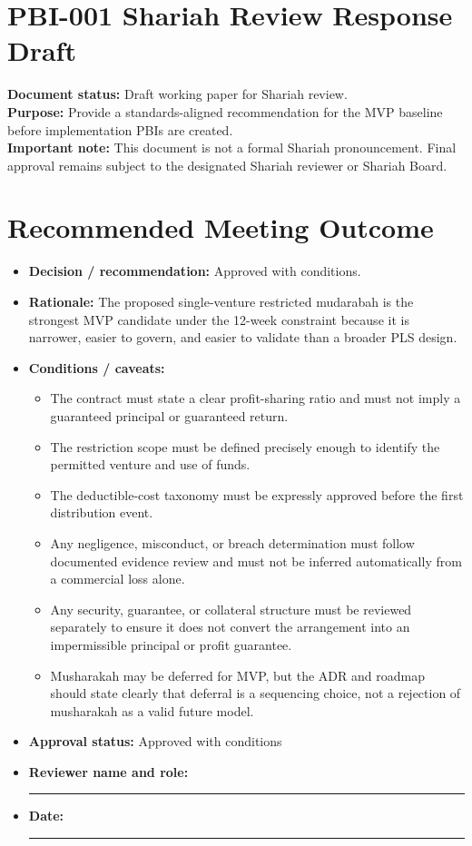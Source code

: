 \documentclass[11pt]{article}
\begin{document}
\section*{PBI-001 Shariah Review Response Draft}

\textbf{Document status:} Draft working paper for Shariah review.\\
\textbf{Purpose:} Provide a standards-aligned recommendation for the MVP baseline before implementation PBIs are created.\\
\textbf{Important note:} This document is not a formal Shariah pronouncement. Final approval remains subject to the designated Shariah reviewer or Shariah Board.

\section*{Recommended Meeting Outcome}

\begin{itemize}[leftmargin=1.5em]
    \item \textbf{Decision / recommendation:} Approved with conditions.
    \item \textbf{Rationale:} The proposed single-venture restricted mudarabah is the strongest MVP candidate under the 12-week constraint because it is narrower, easier to govern, and easier to validate than a broader PLS design.
    \item \textbf{Conditions / caveats:}
    \begin{itemize}[leftmargin=1.5em]
        \item The contract must state a clear profit-sharing ratio and must not imply a guaranteed principal or guaranteed return.
        \item The restriction scope must be defined precisely enough to identify the permitted venture and use of funds.
        \item The deductible-cost taxonomy must be expressly approved before the first distribution event.
        \item Any negligence, misconduct, or breach determination must follow documented evidence review and must not be inferred automatically from a commercial loss alone.
        \item Any security, guarantee, or collateral structure must be reviewed separately to ensure it does not convert the arrangement into an impermissible principal or profit guarantee.
        \item Musharakah may be deferred for MVP, but the ADR and roadmap should state clearly that deferral is a sequencing choice, not a rejection of musharakah as a valid future model.
    \end{itemize}
    \item \textbf{Approval status:} Approved with conditions
    \item \textbf{Reviewer name and role:} \rule{2.5in}{0.4pt}
    \item \textbf{Date:} \rule{1.5in}{0.4pt}
\end{itemize}
\end{document}
